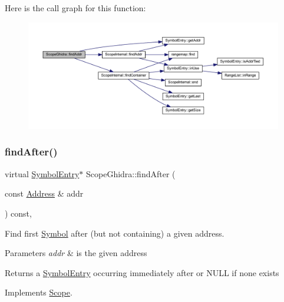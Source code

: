 Here is the call graph for this function\+:
\nopagebreak
\begin{figure}[H]
\begin{center}
\leavevmode
\includegraphics[width=350pt]{class_scope_ghidra_a444989f8c48787af5df27c2a8b234fd3_cgraph}
\end{center}
\end{figure}
\mbox{\label{class_scope_ghidra_a0be881d3586a43ba0b8c4e412ab74005}} 
\subsubsection{\texorpdfstring{findAfter()}{findAfter()}}
{\footnotesize\ttfamily virtual \mbox{\hyperlink{class_symbol_entry}{Symbol\+Entry}}$\ast$ Scope\+Ghidra\+::find\+After (\begin{DoxyParamCaption}\item[{const \mbox{\hyperlink{class_address}{Address}} \&}]{addr }\end{DoxyParamCaption}) const\hspace{0.3cm}{\ttfamily [inline]}, {\ttfamily [virtual]}}



Find first \mbox{\hyperlink{class_symbol}{Symbol}} after (but not containing) a given address. 


\begin{DoxyParams}{Parameters}
{\em addr} & is the given address \\
\hline
\end{DoxyParams}
\begin{DoxyReturn}{Returns}
a \mbox{\hyperlink{class_symbol_entry}{Symbol\+Entry}} occurring immediately after or N\+U\+LL if none exists 
\end{DoxyReturn}


Implements \mbox{\hyperlink{class_scope_a543041620f4398f00d2cc78edc1901b4}{Scope}}.




